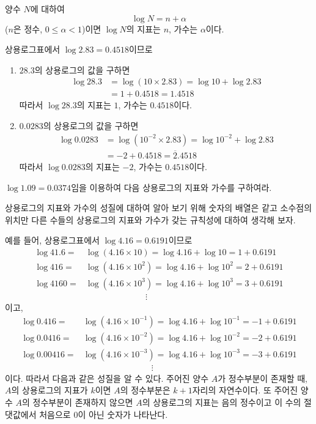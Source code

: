 \documentclass[11pt, a4paper]{book}
\begin{document}
\begin{definition}[지표와 가수]
	양수 $N$에 대하여
	\[
	\log N=n+\alpha
	\]
	($n$은 정수, $0≤\alpha < 1$)이면 $\log N$의 지표는 $n$, 가수는 $\alpha$이다.
\end{definition}
\begin{sample}
	상용로그표에서 $\log 2.83=0.4518$이므로
	\begin{enumerate}[label=(\arabic*)]
		\item $28.3$의 상용로그의 값을 구하면
		\begin{align*}
			\log 28.3&=\log(10\times 2.83)=\log 10+\log 2.83\\
			      			&=1+0.4518=1.4518
		\end{align*}
		따라서 $\log 28.3$의 지표는 $1$, 가수는 $0.4518$이다.
		\item $0.0283$의 상용로그의 값을 구하면
		\begin{align*}
		\log 0.0283  &=\log(10^{-2}\times 2.83)=\log 10^{-2}+\log 2.83\\
		    		          &=-2+0.4518=\overline{2}.4518
		 \end{align*}
		따라서 $\log 0.0283$의 지표는 $-2$, 가수는 $0.4518$이다.
	\end{enumerate}
\end{sample}

\begin{problem}
	$\log 1.09=0.0374$임을 이용하여 다음 상용로그의 지표와 가수를 구하여라.
\end{problem}

상용로그의 지표와 가수의 성질에 대하여 알아 보기  위해 숫자의 배열은 같고 소수점의 위치만 다른 수들의 상용로그의 지표와 가수가 갖는 규칙성에 대하여 생각해 보자.

예를 들어, 상용로그표에서 $\log 4.16=0.6191$이므로
\begin{align*}
    \log 41.6=&\log(4.16\times 10) =\log 4.16+\log 10 =1+0.6191\\
	\log 416=&\log(4.16\times 10^{2})=\log 4.16+\log 10^{2} =2+0.6191\\
	\log 4160=&\log(4.16\times 10^{3})=\log 4.16+\log 10^{3}=3+0.6191\\
& \qquad\qquad\qquad \quad\vdots 
\end{align*}
이고,
\begin{align*}
	\log 0.416=&\log(4.16\times 10^{-1})=\log 4.16+\log 10^{-1}=-1+0.6191\\
	\log 0.0416=&\log(4.16\times 10^{-2})=\log 4.16+\log 10^{-2}=-2+0.6191\\
	\log 0.00416=&\log(4.16\times 10^{-3})=\log 4.16+\log 10^{-3}=-3+0.6191\\
	& \qquad\qquad\qquad \qquad\vdots 
\end{align*}
이다. 따라서 다음과 같은 성질을 알 수 있다.
주어진 양수 $A$가 정수부분이 존재할 때,  $A$의 상용로그의 지표가 $k$이면 $A$의 정수부분은 $k+1$자리의 자연수이다. 또 주어진 양수 $A$의 정수부분이 존재하지 않으면 $A$의 상용로그의 지표는 음의 정수이고 이 수의 절댓값에서 처음으로 $0$이 아닌 숫자가 나타난다.
\end{document}
